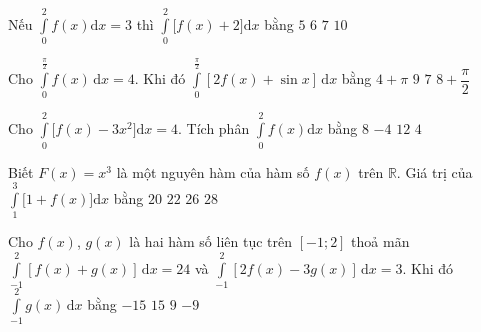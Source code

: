 \begin{ex}[Sở Hà Nội-2025]
 Nếu $\int\limits_0^2 f(x)\mathrm{d}x = 3$ thì $\int\limits_0^2 \big[f(x) + 2\big]\mathrm{d}x$ bằng
 \choice
 {$5$}
 {$6$}
 {\True $7$}
 {$10$}
\end{ex}
\begin{ex}%
    Cho $\displaystyle\int\limits_{0}^{\tfrac{\pi}{2}} f(x) \mathrm{\,d}x = 4$. Khi đó $\displaystyle\int\limits_{0}^{\tfrac{\pi}{2}} [2f(x) + \sin x] \mathrm{\,d}x$ bằng
    \choice
    {$4+\pi$}
    {\True $9$}
    {$7$}
    {$8+\dfrac{\pi}{2}$}
\end{ex}
\begin{ex}
 Cho $\int\limits_0^2 \big[f(x) - 3x^2\big]\mathrm{d}x = 4$. Tích phân $\int\limits_0^2 f(x)\mathrm{d}x$ bằng
 \choice
 {$8$}
 {$-4$}
 {\True $12$}
 {$4$}
\end{ex}
\begin{ex}[BGD-2020]
 Biết $F(x) = x^3$ là một nguyên hàm của hàm số $f(x)$ trên $\mathbb{R}$. Giá trị của $\int\limits_1^3 \big[1 + f(x)\big]\mathrm{d}x$ bằng
 \choice
 {$20$}
 {$22$}
 {$26$}
 {\True $28$}
\end{ex}
\begin{ex}%
    Cho $f(x)$, $g(x)$ là hai hàm số liên tục trên $ [-1;2] $ thoả mãn $\displaystyle\int\limits_{-1}^2[f(x)+g(x)]\mathrm{\,d}x=24$ và   $\displaystyle\int\limits_{-1}^2[2f(x)-3g(x)]\mathrm{\,d}x=3$. Khi đó $\displaystyle\int\limits_{-1}^2g(x)\mathrm{\,d}x$ bằng
    \choice
    {$ -15 $}
    {$ 15 $}
    {\True $ 9 $}
    {$ -9 $}
\end{ex}
